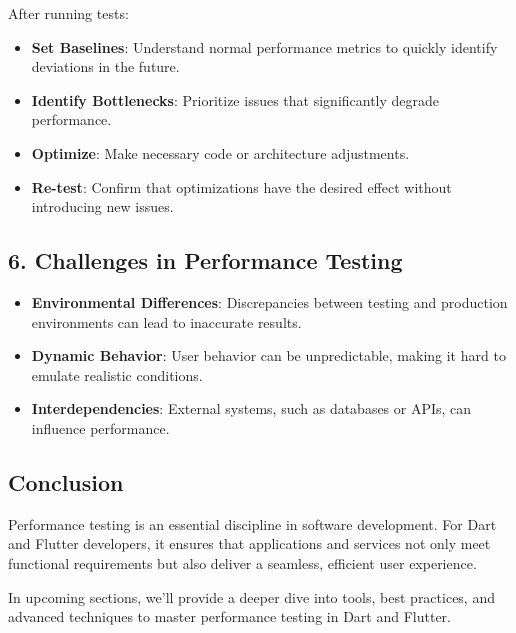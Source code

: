 After running tests:

\begin{itemize}
 \item \textbf{Set Baselines}: Understand normal performance metrics to quickly identify deviations in the future.
 \item \textbf{Identify Bottlenecks}: Prioritize issues that significantly degrade performance.
 \item \textbf{Optimize}: Make necessary code or architecture adjustments.
 \item \textbf{Re-test}: Confirm that optimizations have the desired effect without introducing new issues.
\end{itemize}

\subsection*{6. Challenges in Performance Testing}

\begin{itemize}
 \item \textbf{Environmental Differences}: Discrepancies between testing and production environments can lead to inaccurate results.
 \item \textbf{Dynamic Behavior}: User behavior can be unpredictable, making it hard to emulate realistic conditions.
 \item \textbf{Interdependencies}: External systems, such as databases or APIs, can influence performance.
\end{itemize}

\subsection*{Conclusion}

Performance testing is an essential discipline in software development. 
For Dart and Flutter developers, it ensures that applications and services not only meet functional requirements but also deliver a seamless, efficient user experience.

In upcoming sections, we'll provide a deeper dive into tools, best practices, and advanced techniques to master performance testing in Dart and Flutter.










